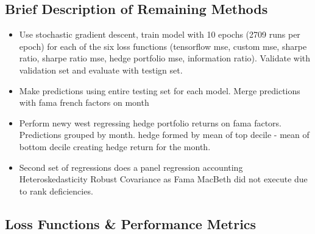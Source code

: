 \documentclass[12pt]{article}
\begin{document}
\subsection{Brief Description of Remaining Methods}
\begin{itemize}
	\item Use stochastic gradient descent, train model with 10 epochs (2709 runs per epoch) for each of the six loss functions (tensorflow mse, custom mse, sharpe ratio, sharpe ratio mse, hedge portfolio mse, information ratio). Validate with validation set and evaluate with testign set.
	\item Make predictions using entire testing set for each model. Merge predictions with fama french factors on month
	\item Perform newy west regressing hedge portfolio returns on fama factors. Predictions grouped by month. hedge formed by mean of top decile - mean of bottom decile creating hedge return for the month.
	\item Second set of regressions does a panel regression  accounting Heteroskedasticity Robust Covariance as Fama MacBeth did not execute due to rank deficiencies.
\end{itemize}
\subsection{Loss Functions \& Performance Metrics}
\end{document}
